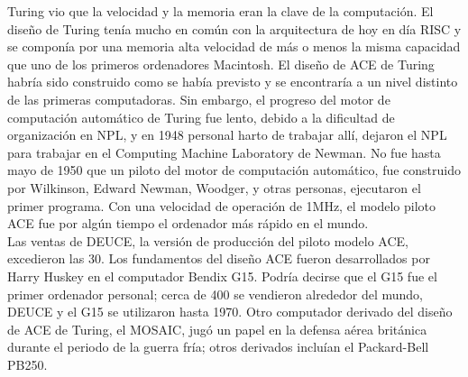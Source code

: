 \documentclass[a4paper]{article}
\begin{document}
    Turing vio que la velocidad y la memoria eran la clave de la computación. El diseño de Turing tenía mucho en común con la arquitectura de hoy en día RISC y se componía por una memoria alta velocidad de más o menos la misma capacidad que uno de los primeros ordenadores Macintosh. El diseño de ACE de Turing habría sido construido como se había previsto y se encontraría a un nivel distinto de las primeras computadoras. Sin embargo, el progreso del motor de computación automático de Turing fue lento, debido a la dificultad de organización en NPL, y en 1948 personal harto de trabajar allí, dejaron el NPL para trabajar en el Computing Machine Laboratory de Newman. No fue hasta mayo de 1950 que un piloto del motor de computación automático, fue construido por Wilkinson, Edward Newman, Woodger, y otras personas, ejecutaron el primer programa. Con una velocidad de operación  de 1MHz, el modelo piloto ACE fue por algún tiempo el ordenador más rápido en el mundo.\\

    Las ventas de DEUCE, la versión de producción del piloto modelo ACE, excedieron las 30. Los fundamentos del diseño ACE  fueron desarrollados por Harry Huskey en el computador Bendix G15. Podría decirse que el G15 fue el primer ordenador personal; cerca de 400 se vendieron alrededor del mundo, DEUCE y el G15 se utilizaron hasta 1970. Otro computador derivado del diseño de ACE de Turing, el MOSAIC, jugó un papel en la defensa aérea británica durante el periodo de la guerra fría; otros derivados incluían el Packard-Bell PB250.

    \newpage
    
    
\end{document}
